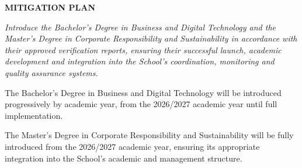 \documentclass[11pt,a4paper]{scrreprt}
\begin{document}
\begin{tcolorbox}[mitbox]
{\footnotesize\sffamily\bfseries\color{green!40!black} MITIGATION PLAN}\par{}
\end{tcolorbox}
\vspace{8pt}

\newpage
{}
{\small\color{mutedcolor}\itshape Introduce the Bachelor's Degree in Business and Digital Technology and the Master's Degree in Corporate Responsibility and Sustainability in accordance with their approved verification reports, ensuring their successful launch, academic development and integration into the School's coordination, monitoring and quality assurance systems. 

The Bachelor's Degree in Business and Digital Technology will be introduced progressively by academic year, from the 2026/2027 academic year until full implementation. 

The Master's Degree in Corporate Responsibility and Sustainability will be fully introduced from the 2026/2027 academic year, ensuring its appropriate integration into the School's academic and management structure. }\par\vspace{6pt}
\end{document}
